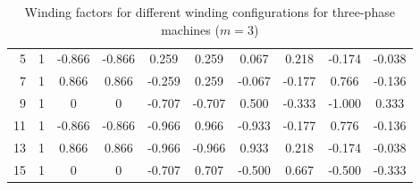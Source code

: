 \begin{frame}
\begin{table}
\begin{tabular}{r c c c c c c c c c}
			5   & 1                                                       & -0.866                                                  & -0.866                                                  & 0.259                & 0.259                & 0.067                & 0.218                & -0.174               & -0.038               \\
			7   & 1                                                       & 0.866                                                   & 0.866                                                   & -0.259               & 0.259                & -0.067               & -0.177               & 0.766                & -0.136               \\
			9   & 1                                                       & 0                                                       & 0                                                       & -0.707               & -0.707               & 0.500                & -0.333               & -1.000               & 0.333                \\
			11  & 1                                                       & -0.866                                                  & -0.866                                                  & -0.966               & 0.966                & -0.933               & -0.177               & 0.776                & -0.136               \\
			13  & 1                                                       & 0.866                                                   & 0.866                                                   & -0.966               & -0.966               & 0.933                & 0.218                & -0.174               & -0.038               \\
			15  & 1                                                       & 0                                                       & 0                                                       & -0.707               & 0.707                & -0.500               & 0.667                & -0.500               & -0.333               \\
			\bottomrule
		\end{tabular}
		\caption{Winding factors for different winding configurations for three-phase machines ($m=3$)}
		\label{tab:Winding_factors}
	\end{table}
\end{frame}


